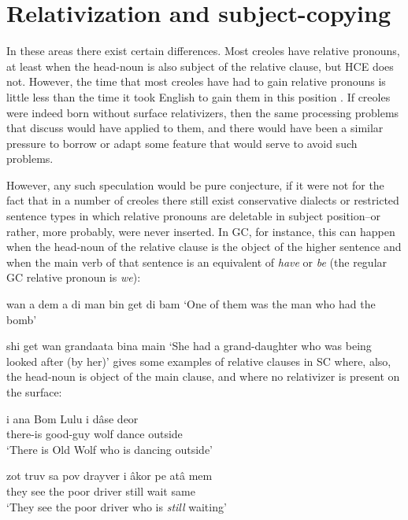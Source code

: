 \section{Relativization and subject-copying}

In these areas there exist certain differences. Most creoles have relative pronouns, at least when the head-noun is also subject of the relative clause, but HCE does not. However, the time that most creoles have had to gain relative pronouns is little less than the time it took English to gain them in this position \citep{BeverEtAl1971}. If creoles were indeed born without surface relativizers, then the same processing problems that \citeauthor{BeverEtAl1971} discuss would have applied to them, and there would have been a similar pressure to borrow or adapt some feature that would serve to avoid such problems.

However, any such speculation would be pure conjecture, if it were not for the fact that in a number of creoles there still exist conservative dialects or restricted sentence types in which relative pronouns are deletable in subject position--or rather, more probably, were never inserted. In GC, for instance, this can happen when the head-noun of the relative clause is the object of the higher sentence and when the main verb of that sentence is an equivalent of \textit{have} or \textit{be} (the regular GC relative pronoun is \textit{we}):

\ea\label{ex:2:39}
 wan a dem a di man bin get di bam
\glt `One of them was the man who had the bomb'
\z

\ea\label{ex:2:40}
 shi get wan grandaata bina main
\glt `She had a grand-daughter who was being looked after (by her)'
\z
\citet[38]{Corne1977} gives some examples of relative clauses in SC where, also, the head-noun is object of the main clause, and where no relativizer is present on the surface:

\ea\label{ex:2:41}
\gll i ana Bom Lulu i d{\^a}se deor\\
{\PM} there-is good-guy wolf {\PM} dance outside \\
\glt `There is Old Wolf who is dancing outside'
\z




\ea\label{ex:2:42}
\gll zot truv sa pov drayver i {\^a}kor pe at{\^a} mem\\
they see the poor driver {\PM} still {\ASP} wait same\\
\glt `They see the poor driver who is \textit{still} waiting'
\z



